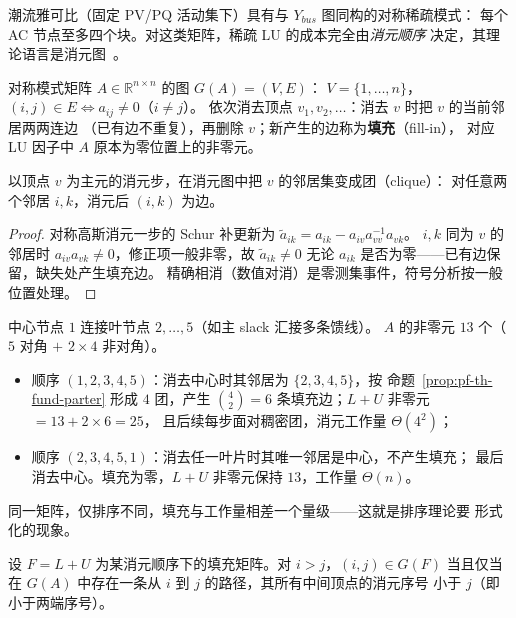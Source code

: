 潮流雅可比（固定 PV/PQ 活动集下）具有与 $Y_{bus}$ 图同构的对称稀疏模式：
每个 AC 节点至多四个块。对这类矩阵，稀疏 LU 的成本完全由\emph{消元顺序}
决定，其理论语言是消元图~\cite{pff:george-liu,pff:davis-suitesparse}。

\begin{definition}[矩阵图与消元图]\label{def:pf-th-fund-elimgraph}
对称模式矩阵 $A\in\mathbb R^{n\times n}$ 的图 $G(A)=(V,E)$：
$V=\{1,\dots,n\}$，$(i,j)\in E\iff a_{ij}\neq0$（$i\neq j$）。
依次消去顶点 $v_1,v_2,\dots$：消去 $v$ 时把 $v$ 的当前邻居两两连边
（已有边不重复），再删除 $v$；新产生的边称为\textbf{填充}（fill-in），
对应 LU 因子中 $A$ 原本为零位置上的非零元。
\end{definition}

\begin{proposition}[Parter 规则]\label{prop:pf-th-fund-parter}
以顶点 $v$ 为主元的消元步，在消元图中把 $v$ 的邻居集变成团（clique）：
对任意两个邻居 $i,k$，消元后 $(i,k)$ 为边。
\end{proposition}

\begin{proof}
对称高斯消元一步的 Schur 补更新为
$\tilde a_{ik}=a_{ik}-a_{iv}a_{vv}^{-1}a_{vk}$。
$i,k$ 同为 $v$ 的邻居时 $a_{iv}a_{vk}\neq0$，修正项一般非零，故
$\tilde a_{ik}\neq0$ 无论 $a_{ik}$ 是否为零——已有边保留，缺失处产生填充边。
精确相消（数值对消）是零测集事件，符号分析按一般位置处理。
\end{proof}

\begin{example}[星形网络的排序敏感性]\label{ex:pf-th-fund-star}
中心节点 $1$ 连接叶节点 $2,\dots,5$（如主 slack 汇接多条馈线）。
$A$ 的非零元 $13$ 个（$5$ 对角 $+$ $2\times4$ 非对角）。
\begin{itemize}
  \item 顺序 $(1,2,3,4,5)$：消去中心时其邻居为 $\{2,3,4,5\}$，按
        命题~\ref{prop:pf-th-fund-parter} 形成 $4$ 团，产生
        $\binom{4}{2}=6$ 条填充边；$L+U$ 非零元 $=13+2\times6=25$，
        且后续每步面对稠密团，消元工作量 $\Theta(4^2)$；
  \item 顺序 $(2,3,4,5,1)$：消去任一叶片时其唯一邻居是中心，不产生填充；
        最后消去中心。填充为零，$L+U$ 非零元保持 $13$，工作量 $\Theta(n)$。
\end{itemize}
同一矩阵，仅排序不同，填充与工作量相差一个量级——这就是排序理论要
形式化的现象。
\end{example}

\begin{proposition}[填充路径刻画]\label{prop:pf-th-fund-fillpath}
设 $F=L+U$ 为某消元顺序下的填充矩阵。对 $i>j$，$(i,j)\in G(F)$ 当且仅当
在 $G(A)$ 中存在一条从 $i$ 到 $j$ 的路径，其所有中间顶点的消元序号
小于 $j$（即小于两端序号）。
\end{proposition}

